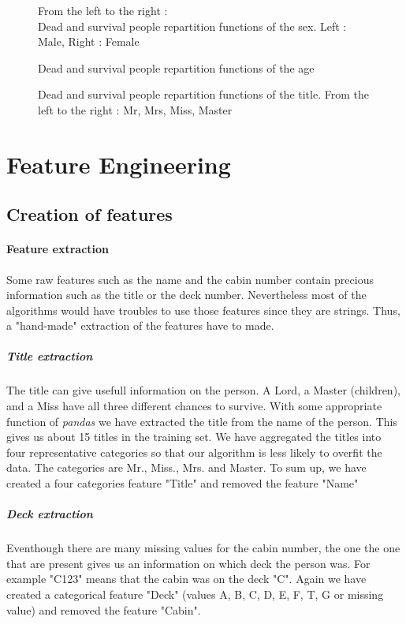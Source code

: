 \documentclass[11pt,a4paper,portrait]{article}
\begin{document}
\begin{figure}
From the left to the right :\\
	\caption{Dead and survival people repartition functions of the sex. Left : Male, Right : Female}
	\label{sexsur}
	\caption{Dead and survival people repartition functions of the age}
	\label{agesur}
	\caption{Dead and survival people repartition functions of the title.
	From the left to the right : Mr, Mrs, Miss, Master}
	\label{titlesur}


	
\end{figure}



\section{Feature Engineering}

\subsection{Creation of features}

\paragraph{Feature extraction}
Some raw features such as the name and the cabin number contain precious information such as the title or the deck number. Nevertheless most of the algorithms would have troubles to use those features since they are strings. Thus, a "hand-made" extraction of the features have to made.

\subparagraph{Title extraction}
The title can give usefull information on the person. A Lord, a Master (children), and a Miss have all three different chances to survive. With some appropriate function of \textit{pandas} we have extracted the title from the name of the person. This gives us about 15 titles in the training set. We have aggregated the titles into four representative categories so that our algorithm is less likely to overfit the data. The categories are Mr., Miss., Mrs. and Master. To sum up, we have created a four categories feature "Title" and removed the feature "Name"


\subparagraph{Deck extraction}
Eventhough there are many missing values for the cabin number, the one the one that are present gives us an information on which deck the person was. For example "C123" means that the cabin was on the deck "C". Again we have created a categorical feature "Deck" (values A, B, C, D, E, F, T, G or missing value) and removed the feature "Cabin".
\end{document}
